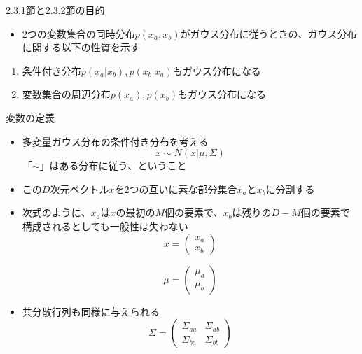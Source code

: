 \begin{frame}{2.3.1節と2.3.2節の目的}
 \begin{itemize}
  \item 2つの変数集合の同時分布$p(x_a,x_b)$がガウス分布に従うときの、ガウス分布に関する以下の性質を示す
 \end{itemize}
 \begin{enumerate}
  \item 条件付き分布$p(x_a|x_b),p(x_b|x_a)$もガウス分布になる
  \item 変数集合の周辺分布$p(x_a),p(x_b)$もガウス分布になる
 \end{enumerate}
\end{frame}

\begin{frame}{変数の定義}
 \begin{itemize}
  \item 多変量ガウス分布の条件付き分布を考える
        \begin{equation}
         x\sim N(x|\mu, \Sigma)
        \end{equation}
        「$\sim$」はある分布に従う、ということ
  \item この$D$次元ベクトル$x$を2つの互いに素な部分集合$x_a$と$x_b$に分割する
  \item 次式のように、$x_a$は$x$の最初の$M$個の要素で、$x_b$は残りの$D-M$個の要素で構成されるとしても一般性は失わない
        \begin{equation}
         x =
          \begin{pmatrix}
           x_a \\
           x_b
          \end{pmatrix}
        \end{equation}

        \begin{equation}
         \mu =
          \begin{pmatrix}
           \mu_a \\
           \mu_b
          \end{pmatrix}
        \end{equation}
  \item 共分散行列も同様に与えられる
        \begin{equation}
         \Sigma =
          \begin{pmatrix}
           \Sigma_{aa} & \Sigma_{ab} \\
           \Sigma_{ba} & \Sigma_{bb}
          \end{pmatrix}
        \end{equation}
 \end{itemize}
\end{frame}

